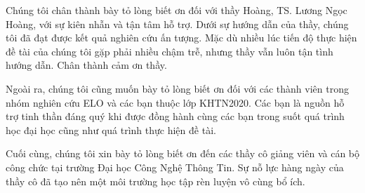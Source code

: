 \begin{acknowledgements}
\addchaptertocentry{\ackname}
Chúng tôi chân thành bày tỏ lòng biết ơn đối với thầy Hoàng, TS. Lương Ngọc Hoàng, với sự kiên nhẫn và tận tâm hỗ trợ. Dưới sự hướng dẫn của thầy, chúng tôi đã đạt được kết quả nghiên cứu ấn tượng. Mặc dù nhiều lúc tiến độ thực hiện đề tài của chúng tôi gặp phải nhiều chậm trễ, nhưng thầy vẫn luôn tận tình hướng dẫn. Chân thành cảm ơn thầy.

Ngoài ra, chúng tôi cũng muốn bày tỏ lòng biết ơn đối với các thành viên trong nhóm nghiên cứu ELO và các bạn thuộc lớp KHTN2020. Các bạn là nguồn hỗ trợ tinh thần đáng quý khi được đồng hành cùng các bạn trong suốt quá trình học đại học cũng như quá trình thực hiện đề tài.

Cuối cùng, chúng tôi xin bày tỏ lòng biết ơn đến các thầy cô giảng viên và cán bộ công chức tại trường Đại học Công Nghệ Thông Tin. Sự nỗ lực hàng ngày của thầy cô đã tạo nên một môi trường học tập rèn luyện vô cùng bổ ích.

\end{acknowledgements}